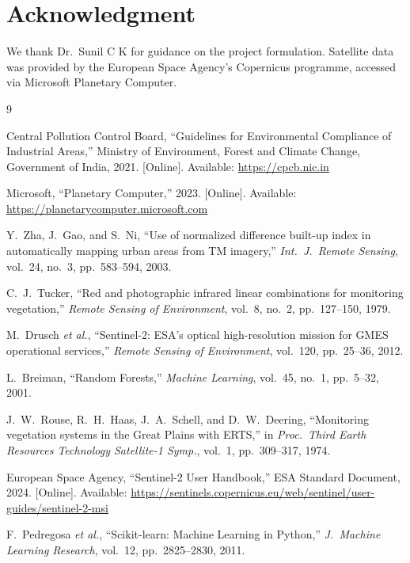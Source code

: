 \documentclass[conference,10pt]{IEEEtran}
\begin{document}
\section*{Acknowledgment}

We thank Dr.\ Sunil C K for guidance on the project formulation. Satellite data was provided by the European Space Agency's Copernicus programme, accessed via Microsoft Planetary Computer.

\begin{thebibliography}{9}

Central Pollution Control Board, ``Guidelines for Environmental Compliance of Industrial Areas,'' Ministry of Environment, Forest and Climate Change, Government of India, 2021. [Online]. Available: \url{https://cpcb.nic.in}

Microsoft, ``Planetary Computer,'' 2023. [Online]. Available: \url{https://planetarycomputer.microsoft.com}

Y.~Zha, J.~Gao, and S.~Ni, ``Use of normalized difference built-up index in automatically mapping urban areas from TM imagery,'' \textit{Int.\ J.\ Remote Sensing}, vol.~24, no.~3, pp.~583--594, 2003.

C.~J.~Tucker, ``Red and photographic infrared linear combinations for monitoring vegetation,'' \textit{Remote Sensing of Environment}, vol.~8, no.~2, pp.~127--150, 1979.

M.~Drusch \textit{et al.}, ``Sentinel-2: ESA's optical high-resolution mission for GMES operational services,'' \textit{Remote Sensing of Environment}, vol.~120, pp.~25--36, 2012.

L.~Breiman, ``Random Forests,'' \textit{Machine Learning}, vol.~45, no.~1, pp.~5--32, 2001.

J.~W.~Rouse, R.~H.~Haas, J.~A.~Schell, and D.~W.~Deering, ``Monitoring vegetation systems in the Great Plains with ERTS,'' in \textit{Proc.\ Third Earth Resources Technology Satellite-1 Symp.}, vol.~1, pp.~309--317, 1974.

European Space Agency, ``Sentinel-2 User Handbook,'' ESA Standard Document, 2024. [Online]. Available: \url{https://sentinels.copernicus.eu/web/sentinel/user-guides/sentinel-2-msi}

F.~Pedregosa \textit{et al.}, ``Scikit-learn: Machine Learning in Python,'' \textit{J.\ Machine Learning Research}, vol.~12, pp.~2825--2830, 2011.

\end{thebibliography}
\end{document}
